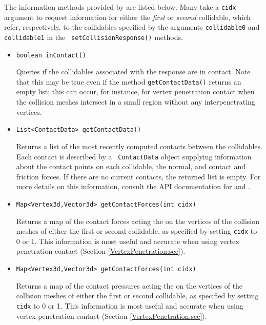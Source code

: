 The information methods provided by 
are listed below. Many take a {\tt cidx} argument to request
information for either the {\it first} or {\it second} collidable,
which refer, respectively, to the collidables specified by the
arguments {\tt collidable0} and {\tt collidable1} in the {\tt
setCollisionResponse()} methods.

\begin{itemize}

\item {\tt boolean inContact()}

Queries if the collidables associated with the response are in
contact.  Note that this may be true even if the method {\tt getContactData()}
returns an empty list; this can occur, for instance, for vertex
penetration contact when the collision meshes intersect in a small
region without any interpenetrating vertices.

\item {\tt List<ContactData> getContactData()}

Returns a list of the most recently computed contacts between the
collidables. Each contact is described by a {\tt
ContactData} object supplying information about the contact
points on each collidable, the normal, and contact and friction
forces.  If there are no current contacts, the returned list is empty.
For more details on this information, consult the API documentation
for
 and
.

\item {\tt Map<Vertex3d,Vector3d> getContactForces(int cidx)}

Returns a map of the contact forces acting the on the vertices of the
collision meshes of either the first or second collidable, as
specified by setting {\tt cidx} to 0 or 1. This information is most
useful and accurate when using vertex penetration contact
(Section \ref{VertexPenetration:sec}).

\item {\tt Map<Vertex3d,Vector3d> getContactForces(int cidx)}

Returns a map of the contact pressures acting the on the vertices of
the collision meshes of either the first or second collidable, as
specified by setting {\tt cidx} to 0 or 1.  This information is most
useful and accurate when using vertex penetration contact
(Section \ref{VertexPenetration:sec}).


\end{itemize}
